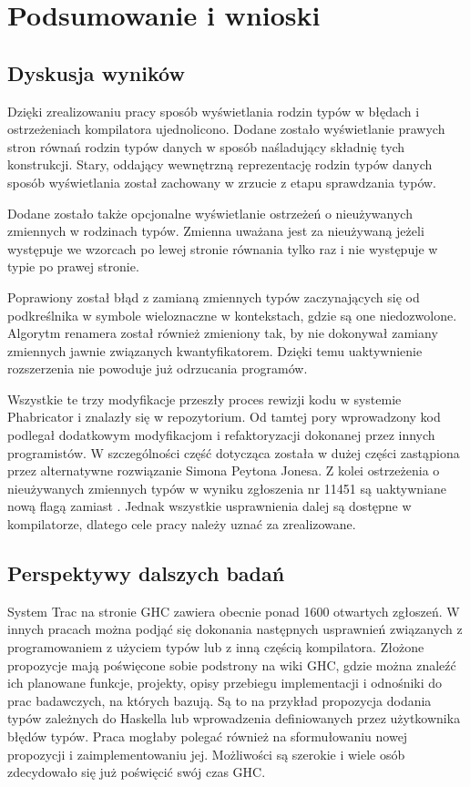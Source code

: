 \chapter{Podsumowanie i wnioski}\label{chap:podsumowanie}

\section{Dyskusja wyników}

Dzięki zrealizowaniu pracy sposób wyświetlania rodzin typów w błędach i
ostrzeżeniach kompilatora ujednolicono. Dodane zostało wyświetlanie prawych
stron równań rodzin typów danych w sposób naśladujący składnię tych
konstrukcji. Stary, oddający wewnętrzną reprezentację rodzin typów danych sposób
wyświetlania został zachowany w zrzucie z etapu sprawdzania typów.

Dodane zostało także opcjonalne wyświetlanie ostrzeżeń o nieużywanych zmiennych
w rodzinach typów. Zmienna uważana jest za nieużywaną jeżeli występuje we
wzorcach po lewej stronie równania tylko raz i nie występuje w typie po prawej
stronie.

Poprawiony został błąd z zamianą zmiennych typów zaczynających się od
podkreślnika w symbole wieloznaczne w kontekstach, gdzie są one
niedozwolone. Algorytm renamera został również zmieniony tak, by nie dokonywał
zamiany zmiennych jawnie związanych kwantyfikatorem. Dzięki temu uaktywnienie
rozszerzenia  nie powoduje już odrzucania programów.

Wszystkie te trzy modyfikacje przeszły proces rewizji kodu w systemie
Phabricator i znalazły się w repozytorium. Od tamtej pory wprowadzony kod
podlegał dodatkowym modyfikacjom i refaktoryzacji dokonanej przez innych
programistów. W szczególności część dotycząca  została
w dużej części zastąpiona przez alternatywne rozwiązanie Simona
Peytona Jonesa. Z kolei ostrzeżenia o nieużywanych zmiennych typów w wyniku
zgłoszenia nr 11451 są uaktywniane nową flagą 
zamiast .
Jednak wszystkie usprawnienia dalej są dostępne w
kompilatorze, dlatego cele pracy należy uznać za zrealizowane.

\section{Perspektywy dalszych badań}
System Trac na stronie GHC zawiera obecnie ponad 1600 otwartych
zgłoszeń\cite{WikiTickets}. W innych pracach można podjąć się dokonania następnych
usprawnień związanych z programowaniem z użyciem typów lub z inną częścią
kompilatora. Złożone propozycje mają poświęcone sobie podstrony na wiki GHC,
gdzie można znaleźć ich planowane funkcje, projekty, opisy przebiegu
implementacji i odnośniki do prac badawczych, na których bazują. Są to na
przykład propozycja dodania typów zależnych do Haskella lub wprowadzenia
definiowanych przez użytkownika błędów typów. Praca mogłaby polegać również na
sformułowaniu nowej propozycji i zaimplementowaniu jej. Możliwości są szerokie i
wiele osób zdecydowało się już poświęcić swój czas GHC.
